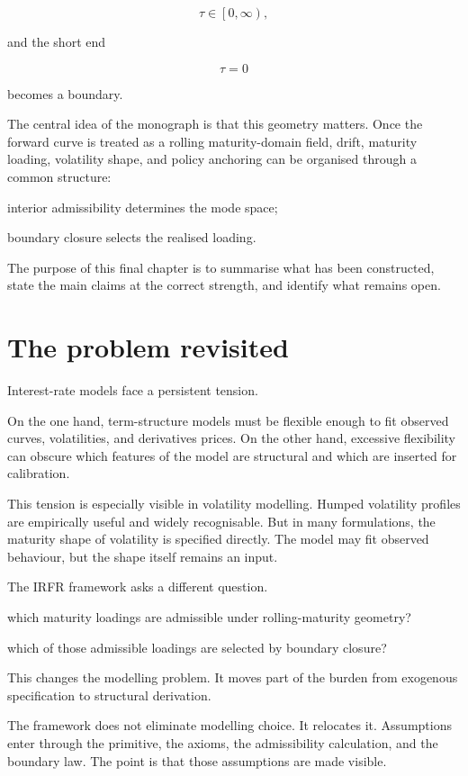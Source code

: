 \documentclass[11pt,oneside]{book}
\begin{document}
\[
\tau\in\left[0,\infty\right),
\]

and the short end

\[
\tau=0
\]

becomes a boundary.

The central idea of the monograph is that this geometry matters. Once
the forward curve is treated as a rolling maturity-domain field, drift,
maturity loading, volatility shape, and policy anchoring can be
organised through a common structure:

interior admissibility determines the mode space;

boundary closure selects the realised loading.

The purpose of this final chapter is to summarise what has been
constructed, state the main claims at the correct strength, and identify
what remains open.

\section{The problem revisited}\label{the-problem-revisited}

Interest-rate models face a persistent tension.

On the one hand, term-structure models must be flexible enough to fit
observed curves, volatilities, and derivatives prices. On the other
hand, excessive flexibility can obscure which features of the model are
structural and which are inserted for calibration.

This tension is especially visible in volatility modelling. Humped
volatility profiles are empirically useful and widely recognisable. But
in many formulations, the maturity shape of volatility is specified
directly. The model may fit observed behaviour, but the shape itself
remains an input.

The IRFR framework asks a different question.

which maturity loadings are admissible under rolling-maturity geometry?

which of those admissible loadings are selected by boundary closure?

This changes the modelling problem. It moves part of the burden from
exogenous specification to structural derivation.

The framework does not eliminate modelling choice. It relocates it.
Assumptions enter through the primitive, the axioms, the admissibility
calculation, and the boundary law. The point is that those assumptions
are made visible.
\end{document}
